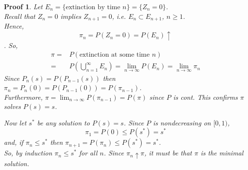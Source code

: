 \documentclass[12pt]{article}
\theoremstyle{definition}
\theoremstyle{plain}
\newtheorem*{myproof}{Proof}
\begin{document}
\begin{myproof}
Let $E_n = \{\mbox{extinction by time $n$}\} = \{Z_n = 0\}$. \\
Recall that $Z_n = 0$ implies $Z_{n+1} = 0$, i.e. $E_n \subset E_{n+1}$, $n \geq 1$. \\
Hence, \begin{displaymath} \pi_n = P(Z_n =0) = P(E_n) \uparrow \end{displaymath}.
So, \begin{displaymath} \begin{aligned} \pi =& P(\mbox{extinction at some time $n$}) \\ =& P(\bigcup_{n=1}^\infty E_n) = \lim_{n \rightarrow \infty} P(E_n) = \lim_{n \rightarrow \infty} \pi_n
\end{aligned} \end{displaymath}
Since $P_n(s) = P(P_{n-1}(s))$ then $\pi_n = P_n(0) = P(P_{n-1}(0)) = P(\pi_{n-1})$. \\
Furthermore, $\pi = \lim_{n \rightarrow \infty} P(\pi_{n-1}) = P(\pi)$ since $P$ is cont. This confirms $\pi
$ solves $P(s) = s$.


Now let $s^*$ be any solution to $P(s) = s$. Since $P$ is nondecreasing on $[0,1)$, \[\pi_1 = P(0) \leq P(s^*) = s^*\] and, if $\pi_{n} \leq s^*$ then $\pi_{n+1} = P(\pi_n) \leq P(s^*) = s^*$. \\
So, by induction $\pi_n \leq s^*$ for all $n$. Since $\pi_n \uparrow \pi$, it must be that $\pi$ is the minimal solution. 



\end{myproof}
\end{document}
